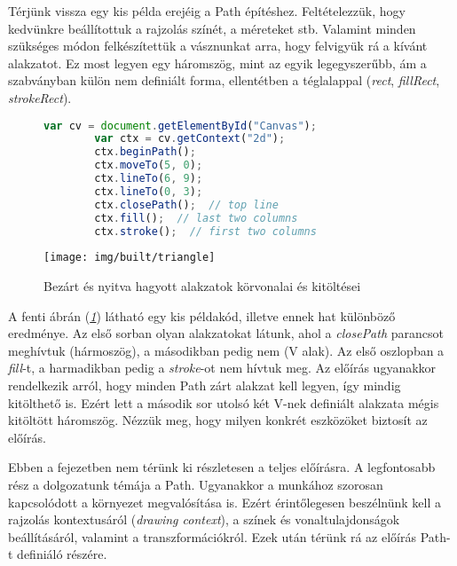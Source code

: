 \documentclass[12pt]{report}
\theoremstyle{definition}
\newcommand{\inenglish}[1]{\textsl{#1}}
\newcommand{\func}[1]{{\textsl{#1}}}
\begin{document}
Térjünk vissza egy kis példa erejéig a Path építéshez. Feltételezzük, hogy
kedvünkre beállítottuk a rajzolás színét, a méreteket stb. Valamint minden
szükséges módon felkészítettük a vásznunkat arra, hogy felvigyük rá a kívánt
alakzatot. Ez most legyen egy háromszög, mint az egyik legegyszerűbb, ám a
szabványban külön nem definiált forma, ellentétben a téglalappal (\emph{rect},
\emph{fillRect}, \emph{strokeRect}).

  \begin{figure}[!htb]
    \hspace{0.1\textwidth}
      \centering
      \begin{lstlisting}[language=JavaScript, autogobble=true]
        var cv = document.getElementById("Canvas");
        var ctx = cv.getContext("2d");
        ctx.beginPath();
        ctx.moveTo(5, 0);
        ctx.lineTo(6, 9);
        ctx.lineTo(0, 3);
        ctx.closePath();  // top line
        ctx.fill();  // last two columns
        ctx.stroke();  // first two columns
      \end{lstlisting}
    \endminipage
    \hfill
      \texttt{[image: img/built/triangle]}
    \endminipage
    \caption{\label{fig:triangles} Bezárt és nyitva hagyott
    alakzatok körvonalai és kitöltései}
  \end{figure}

A fenti ábrán (\emph{\ref{fig:triangles}}) látható egy kis példakód,
illetve ennek hat különböző eredménye. Az első sorban olyan alakzatokat látunk,
ahol a \func{closePath} parancsot meghívtuk (hármoszög), a másodikban pedig nem
(V alak). Az első oszlopban a \func{fill}-t, a harmadikban pedig a
\func{stroke}-ot nem hívtuk meg. Az előírás ugyanakkor rendelkezik arról, hogy
minden Path zárt alakzat kell legyen, így mindig kitölthető is. Ezért lett a
második sor utolsó két V-nek definiált alakzata mégis kitöltött háromszög.
Nézzük meg, hogy milyen konkrét eszközöket biztosít az előírás.

Ebben a fejezetben nem térünk ki részletesen a teljes előírásra. A legfontosabb
rész a dolgozatunk témája a Path. Ugyanakkor a munkához szorosan kapcsolódott a
környezet megvalósítása is. Ezért érintőlegesen beszélnünk kell a rajzolás
kontextusáról (\inenglish{drawing context}), a színek és vonaltulajdonságok
beállításáról, valamint a transzformációkról. Ezek után térünk rá az előírás
Path-t definiáló részére.
\end{document}

